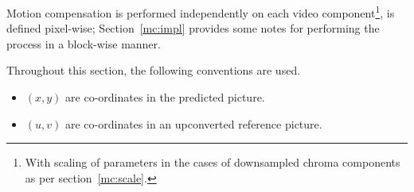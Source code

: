 Motion compensation is performed independently on each video
component\footnote{With scaling of parameters in the cases of
downsampled chroma components as per section~\ref{mc:scale}.}, is
defined pixel-wise; Section~\ref{mc:impl} provides some notes for
performing the process in a block-wise manner.

Throughout this section, the following conventions are used.

\begin{itemize}
\item $(x,y)$ are co-ordinates in the predicted picture.
\item $(u,v)$ are co-ordinates in an upconverted reference picture.
\end{itemize}

\begin{comment}
For each component, motion compensation is effected by forming a
prediction for each pixel within the component and adding it to the
pixel value. Specifically, for luma components, set

The use of OBMC implies that each pixel may fall into between 1 and 4
Prediction Units (), and the prediction value is a weighted combination
of predictions from each prediction unit of which the pixel is a member.
\end{comment}
